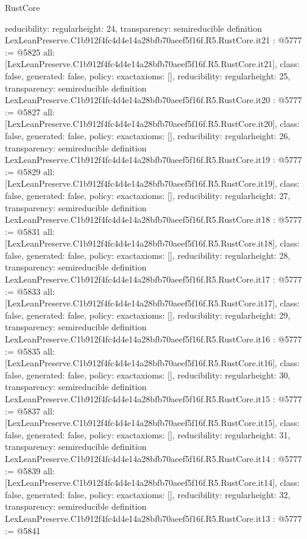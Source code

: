 \begin{lexlean}{RustCore}
\begin{coremodule}
{  reducibility: regular{height: 24},
  transparency: semireducible
}
definition LexLeanPreserve.C1b912f4fc4d4e14a28bfb70aeef5f16f.R5.RustCore.it21 : @5777 := @5825 {
  all: [LexLeanPreserve.C1b912f4fc4d4e14a28bfb70aeef5f16f.R5.RustCore.it21],
  class: false,
  generated: false,
  policy: exact{axioms: []},
  reducibility: regular{height: 25},
  transparency: semireducible
}
definition LexLeanPreserve.C1b912f4fc4d4e14a28bfb70aeef5f16f.R5.RustCore.it20 : @5777 := @5827 {
  all: [LexLeanPreserve.C1b912f4fc4d4e14a28bfb70aeef5f16f.R5.RustCore.it20],
  class: false,
  generated: false,
  policy: exact{axioms: []},
  reducibility: regular{height: 26},
  transparency: semireducible
}
definition LexLeanPreserve.C1b912f4fc4d4e14a28bfb70aeef5f16f.R5.RustCore.it19 : @5777 := @5829 {
  all: [LexLeanPreserve.C1b912f4fc4d4e14a28bfb70aeef5f16f.R5.RustCore.it19],
  class: false,
  generated: false,
  policy: exact{axioms: []},
  reducibility: regular{height: 27},
  transparency: semireducible
}
definition LexLeanPreserve.C1b912f4fc4d4e14a28bfb70aeef5f16f.R5.RustCore.it18 : @5777 := @5831 {
  all: [LexLeanPreserve.C1b912f4fc4d4e14a28bfb70aeef5f16f.R5.RustCore.it18],
  class: false,
  generated: false,
  policy: exact{axioms: []},
  reducibility: regular{height: 28},
  transparency: semireducible
}
definition LexLeanPreserve.C1b912f4fc4d4e14a28bfb70aeef5f16f.R5.RustCore.it17 : @5777 := @5833 {
  all: [LexLeanPreserve.C1b912f4fc4d4e14a28bfb70aeef5f16f.R5.RustCore.it17],
  class: false,
  generated: false,
  policy: exact{axioms: []},
  reducibility: regular{height: 29},
  transparency: semireducible
}
definition LexLeanPreserve.C1b912f4fc4d4e14a28bfb70aeef5f16f.R5.RustCore.it16 : @5777 := @5835 {
  all: [LexLeanPreserve.C1b912f4fc4d4e14a28bfb70aeef5f16f.R5.RustCore.it16],
  class: false,
  generated: false,
  policy: exact{axioms: []},
  reducibility: regular{height: 30},
  transparency: semireducible
}
definition LexLeanPreserve.C1b912f4fc4d4e14a28bfb70aeef5f16f.R5.RustCore.it15 : @5777 := @5837 {
  all: [LexLeanPreserve.C1b912f4fc4d4e14a28bfb70aeef5f16f.R5.RustCore.it15],
  class: false,
  generated: false,
  policy: exact{axioms: []},
  reducibility: regular{height: 31},
  transparency: semireducible
}
definition LexLeanPreserve.C1b912f4fc4d4e14a28bfb70aeef5f16f.R5.RustCore.it14 : @5777 := @5839 {
  all: [LexLeanPreserve.C1b912f4fc4d4e14a28bfb70aeef5f16f.R5.RustCore.it14],
  class: false,
  generated: false,
  policy: exact{axioms: []},
  reducibility: regular{height: 32},
  transparency: semireducible
}
definition LexLeanPreserve.C1b912f4fc4d4e14a28bfb70aeef5f16f.R5.RustCore.it13 : @5777 := @5841 {
}
\end{coremodule}
\end{lexlean}
